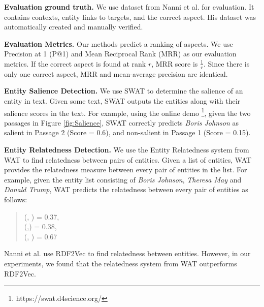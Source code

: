 \textbf{Evaluation ground truth.} We use dataset from Nanni et al. \cite{nanni2018entity} for evaluation. It contains contexts, entity links to targets, and the correct aspect. His dataset was automatically created and manually verified. %
%

\textbf{Evaluation Metrics.} Our methods predict a ranking of aspects. We use Precision at 1 (P@1) and Mean Reciprocal Rank (MRR) as our evaluation metrics. If the correct aspect is found at rank $r$, MRR score is $\frac{1}{r}$. Since there is only one correct aspect, MRR and mean-average precision are identical.


\textbf{Entity Salience Detection.} We use SWAT \cite{swat}  to determine the salience of an entity in text. Given some text, SWAT outputs the entities along with their salience scores in the text. For example, using the online demo \footnote{https://swat.d4science.org/}, given the two passages in Figure \ref{fig:Salience}, SWAT correctly predicts \textit{Boris Johnson} as salient in Passage 2 (Score = 0.6), and non-salient in Passage 1 (Score = 0.15). 

\textbf{Entity Relatedness Detection.}  We use the Entity Relatedness system from WAT \cite{piccinno2014wat} to find relatedness between pairs of entities. Given a list of entities, WAT provides the relatedness measure between every pair of entities in the list. For example, given the entity list consisting of \textit{Boris Johnson}, \textit{Theresa May} and \textit{Donald Trump}, WAT predicts the relatedness between every pair of entities as follows:
\begin{quote}
    (, ) = 0.37, \\
    (,)    = 0.38, \\
    (, )  = 0.67
\end{quote}
Nanni et al. \cite{nanni2018entity} use RDF2Vec \cite{ristoski2016rdf2vec} to find relatedness between entities. However, in our experiments, we found that the relatedness system from WAT outperforms RDF2Vec.

